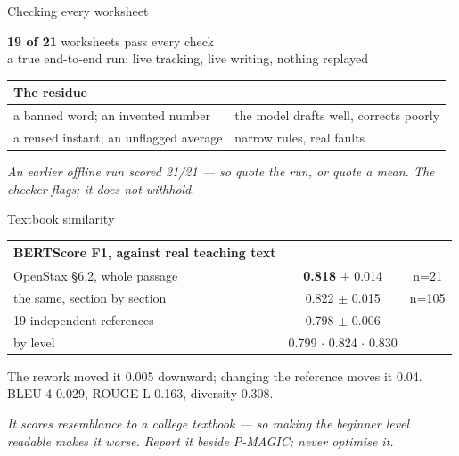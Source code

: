 \documentclass[aspectratio=169,10pt]{beamer}
\newcommand{\takeaway}[1]{\vfill{\footnotesize\itshape\color{cGrey}#1\par}}
\begin{document}
\begin{frame}{Checking every worksheet}
\vfill
\begin{center}
{\Large\textbf{\color{cApp}19 of 21} worksheets pass every check}\\[2pt]
{\footnotesize a true end-to-end run: live tracking, live writing, nothing replayed}
\end{center}
\vfill
\begin{center}
\small
\renewcommand{\arraystretch}{1.4}
\begin{tabular}{@{}ll@{}}
\toprule
\rowcolor{cMeas!12}
\textbf{The residue} & \\
\midrule
a banned word; an invented number & the model drafts well, corrects poorly \\
a reused instant; an unflagged average & narrow rules, real faults \\
\bottomrule
\end{tabular}
\end{center}
\vfill
\takeaway{An earlier offline run scored 21/21 --- so quote the run, or quote a mean. The checker
flags; it does not withhold.}
\end{frame}

\begin{frame}{Textbook similarity}
\vfill
\begin{center}
\small
\renewcommand{\arraystretch}{1.45}
\begin{tabular}{@{}p{6.0cm}cc@{}}
\toprule
\rowcolor{cMeas!12}
\textbf{BERTScore F1, against real teaching text} & & \\
\midrule
OpenStax \S6.2, whole passage & \textbf{0.818} $\pm$ 0.014 & {\footnotesize n=21} \\
the same, section by section & 0.822 $\pm$ 0.015 & {\footnotesize n=105} \\
19 independent references & 0.798 $\pm$ 0.006 & \\
\midrule
by level & {\color{cBasic}0.799} $\cdot$ {\color{cInter}0.824} $\cdot$ {\color{cAdv}0.830} & \\
\bottomrule
\end{tabular}
\end{center}
\vfill
\begin{center}
{\footnotesize The rework moved it 0.005 downward; changing the reference moves it 0.04.\\
BLEU-4 0.029, ROUGE-L 0.163, diversity 0.308.}
\end{center}
\vfill
\takeaway{It scores resemblance to a college textbook --- so making the beginner level readable
makes it worse. Report it beside P-MAGIC; never optimise it.}
\end{frame}
\end{document}
